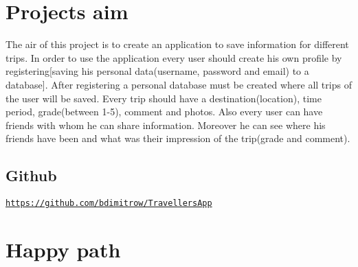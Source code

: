 \hypertarget{index_First}{}\section{Project\textquotesingle{}s aim}\label{index_First}
The air of this project is to create an application to save information for different trips. In order to use the application every user should create his own profile by registering\mbox{[}saving his personal data(username, password and email) to a database\mbox{]}. After registering a personal database must be created where all trips of the user will be saved. Every trip should have a destination(location), time period, grade(between 1-\/5), comment and photos. Also every user can have friends with whom he can share information. Moreover he can see where his friends have been and what was their impression of the trip(grade and comment).\hypertarget{index_Github}{}\subsection{Github}\label{index_Github}
\href{https://github.com/bdimitrow/TravellersApp}{\tt https\+://github.\+com/bdimitrow/\+Travellers\+App}\hypertarget{index_Second}{}\section{Happy path}\label{index_Second}

